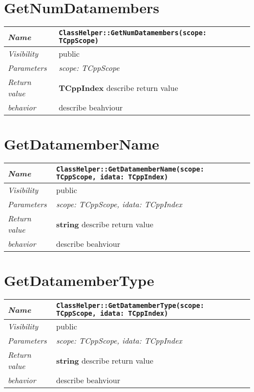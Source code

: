  \section{GetNumDatamembers}
\begin{longtable}{p{3cm} @{\hskip 1cm} p{12cm}}
 \hline
\textit{Name} & \texttt{ClassHelper::GetNumDatamembers(scope: TCppScope)}\\
\hline
 \textit{Visibility} & public\\
\hline
\textit{Parameters} & \textit{scope: TCppScope}\\
\hline
\textit{Return value} & \textbf{ TCppIndex} describe return value\\
  \hline
 \textit{behavior} & describe beahviour \\
\hline
\end{longtable} \pagebreak
 \section{GetDatamemberName}
\begin{longtable}{p{3cm} @{\hskip 1cm} p{12cm}}
 \hline
\textit{Name} & \texttt{ClassHelper::GetDatamemberName(scope: TCppScope, idata: TCppIndex)}\\
\hline
 \textit{Visibility} & public\\
\hline
\textit{Parameters} & \textit{scope: TCppScope, idata: TCppIndex}\\
\hline
\textit{Return value} & \textbf{ string} describe return value\\
  \hline
 \textit{behavior} & describe beahviour \\
\hline
\end{longtable} \pagebreak
 \section{GetDatamemberType}
\begin{longtable}{p{3cm} @{\hskip 1cm} p{12cm}}
 \hline
\textit{Name} & \texttt{ClassHelper::GetDatamemberType(scope: TCppScope, idata: TCppIndex)}\\
\hline
 \textit{Visibility} & public\\
\hline
\textit{Parameters} & \textit{scope: TCppScope, idata: TCppIndex}\\
\hline
\textit{Return value} & \textbf{ string} describe return value\\
  \hline
 \textit{behavior} & describe beahviour \\
\hline
\end{longtable} \pagebreak
